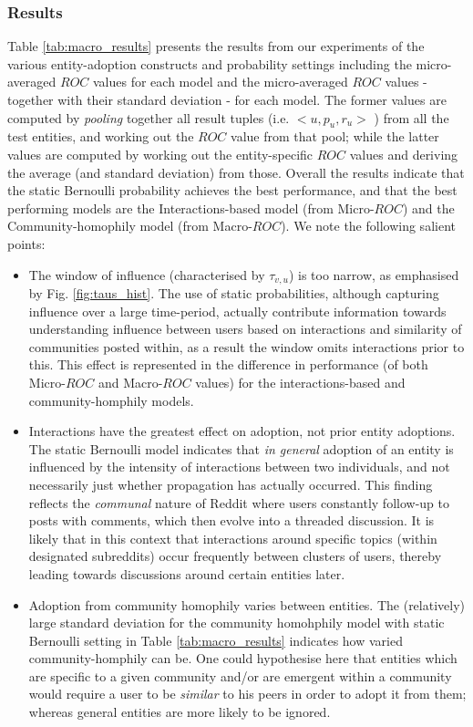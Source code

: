 \documentclass[10pt,journal,compsoc]{IEEEtran}
\begin{document}
\subsubsection{Results}
Table \ref{tab:macro_results} presents the results from our experiments of the various entity-adoption constructs and probability settings including the micro-averaged $ROC$ values for each model and the micro-averaged $ROC$ values - together with their standard deviation - for each model.
The former values are computed by \emph{pooling} together all result tuples (i.e. $<u, p_u, r_u>$ ) from all the test entities, and working out the $ROC$ value from that pool; while the latter values are computed by working out the entity-specific $ROC$ values and deriving the average (and standard deviation) from those.
Overall the results indicate that the static Bernoulli probability achieves the best performance, and that the best performing models are the Interactions-based model (from Micro-$ROC$) and the Community-homophily model (from Macro-$ROC$).
We note the following salient points:

\begin{itemize}
	\item The window of influence (characterised by $\tau_{v,u}$) is too narrow, as emphasised by Fig. \ref{fig:taus_hist}. 
	The use of static probabilities, although capturing influence over a large time-period, actually contribute information towards understanding influence between users based on interactions and similarity of communities posted within, as a result the window omits interactions prior to this.
	This effect is represented in the difference in performance (of both Micro-$ROC$ and Macro-$ROC$ values) for the interactions-based and community-homphily models.
		
	\item Interactions have the greatest effect on adoption, not prior entity adoptions.
	The static Bernoulli model indicates that \emph{in general} adoption of an entity is influenced by the intensity of interactions between two individuals, and not necessarily just whether propagation has actually occurred.
	This finding reflects the \emph{communal} nature of Reddit where users constantly follow-up to posts with comments, which then evolve into a threaded discussion.
	It is likely that in this context that interactions around specific topics (within designated subreddits) occur frequently between clusters of users, thereby leading towards discussions around certain entities later.
	
	\item Adoption from community homophily varies between entities.
	The (relatively) large standard deviation for the community homohphily model with static Bernoulli setting in Table \ref{tab:macro_results} indicates how varied community-homphily can be.
	One could hypothesise here that entities which are specific to a given community and/or are emergent within a community would require a user to be \emph{similar} to his peers in order to adopt it from them; whereas general entities are more likely to be ignored.
	
\end{itemize}
\end{document}
